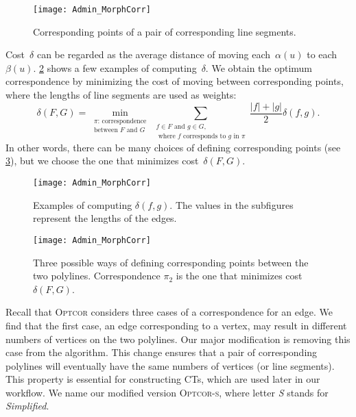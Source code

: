 \begin{figure}[tb]
\centering
\texttt{[image: Admin\_MorphCorr]}
\caption{Corresponding points of 
a pair of corresponding line segments.}
\label{fig:Admin_Integral_Correspondence}
\end{figure}

Cost~$\delta$ can be regarded as the average distance of 
moving each~$\alpha(u)$ to each~$\beta(u)$.
\fig\ref{fig:Admin_IntegralComputation} 
shows a few examples of computing~$\delta$. 
We obtain the optimum correspondence by
minimizing the cost of moving between corresponding points, 
where the lengths of line segments are used as weights:
\[
\delta(F,G) =
\min_
{\substack
	{\pi \text{: correspondence} \\ 
		\text{between $F$ and $G$}
	}
} 
\sum_
{\substack
	{f\in F \text{ and }g\in G, \\ 
		\text{ where } f \text{ corresponds to } g \text{ in } 
		\pi
	}
}
\frac{|f|+|g|}{2} \delta(f,g).
\]
In other words, there can be many choices of 
defining corresponding points
(see \fig\ref{fig:Admin_ChooseCorrespondence}),
but we choose the one that minimizes cost~$\delta(F,G)$.


\begin{figure}[tb]
\centering
\texttt{[image: Admin\_MorphCorr]}
\caption{Examples of computing $\delta(f,g)$. 
The values in the subfigures 
represent the lengths of the edges.}
\label{fig:Admin_IntegralComputation}
\end{figure}

\begin{figure}[tb]
\centering
\texttt{[image: Admin\_MorphCorr]}
\caption{Three possible ways of defining corresponding points
	between the two polylines.
	Correspondence $\pi_2$ is the one 
	that minimizes cost~$\delta(F,G)$.
}
\label{fig:Admin_ChooseCorrespondence}
\end{figure}

Recall that \textsc{Optcor} considers three cases of a 
correspondence for an edge. 
We find that the first case, an edge corresponding to a vertex, 
may result in different numbers of vertices 
on the two polylines.  
Our major modification is removing this case 
from the algorithm.
This change ensures that
a pair of corresponding polylines 
will eventually have the same 
numbers of vertices (or line segments).
This property is essential for 
constructing CTs, 
which are used later in our workflow.  
We name our modified version \textsc{Optcor-s}, 
where letter \emph{S} stands for \emph{Simplified}.

